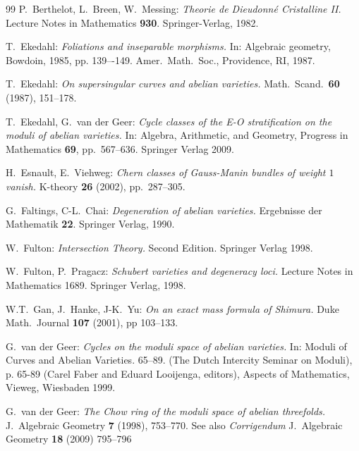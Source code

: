 \documentclass[11pt]{amsart}
\numberwithin{equation}{section}
\theoremstyle{definition}
\theoremstyle{remark}
\begin{document}
\begin{thebibliography}{99}
P.\ Berthelot, L.\ Breen, W.\ Messing:
{\sl Theorie de Dieudonn\'e Cristalline II.}
Lecture Notes in Mathematics \textbf{930}.
Springer-Verlag, 1982.

T.\ Ekedahl: {\sl Foliations and inseparable morphisms.} In: 
Algebraic geometry, Bowdoin, 1985, pp. 139–-149. 
Amer.\ Math.\ Soc., Providence, RI, 1987.

 T.\ Ekedahl:
{\sl On supersingular curves and abelian varieties.}
Math.\ Scand.\ \textbf{60} (1987), 151--178.

 T.\ Ekedahl, G.\ van der Geer:
{\sl Cycle classes of the E-O stratification on the moduli of abelian varieties.}
In: {Algebra, Arithmetic, and Geometry}, Progress in Mathematics \textbf{69}, pp.\
567--636.
Springer Verlag 2009.

 H.\ Esnault, E.\ Viehweg:
{\sl Chern classes of Gauss-Manin bundles of weight $1$ vanish. }
K-theory \textbf{26} (2002), pp.\ 287--305.


 G.\ Faltings, C-L.\ Chai: 
{\sl Degeneration of abelian varieties.}
Ergebnisse der Mathematik \textbf{22}.  Springer Verlag, 1990.

 W.\ Fulton:
{\sl Intersection Theory.} Second Edition. Springer Verlag 1998.

 W.\ Fulton, P.\ Pragacz:
{\sl Schubert varieties and degeneracy loci.}
Lecture Notes in Mathematics 1689.
Springer Verlag, 1998. 

 W.T.\ Gan, J.\ Hanke, J-K.\ Yu:
{\sl On an exact mass formula of Shimura.}
Duke Math.\ Journal
\textbf{107} (2001), pp 103--133.

 G.\ van der Geer:
{\sl Cycles on the moduli space of abelian varieties.}
In: Moduli of Curves and Abelian Varieties. 65--89.
(The Dutch Intercity Seminar on Moduli), p. 65-89 (Carel Faber and Eduard Looijenga, editors), Aspects of Mathematics, Vieweg, Wiesbaden 1999. 

 G.\ van der Geer:
{\sl The Chow ring of the moduli space of abelian threefolds.}
J.\ Algebraic Geometry \textbf{7} (1998), 753--770. See
also {\sl Corrigendum} J.\ Algebraic Geometry \textbf{18} (2009) 795--796



\end{thebibliography}
\end{document}
